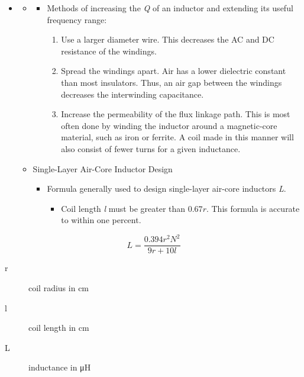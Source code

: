\begin{itemize}
	\item[] 
	\begin{itemize}
		\item[]
		\begin{itemize}
			\item Methods of increasing the \textit{Q} of an inductor and extending its useful frequency range:
			\begin{enumerate}
				\item Use a larger diameter wire. This decreases the AC and
				DC resistance of the windings.
				\item Spread the windings apart. Air has a lower dielectric
				constant than most insulators. Thus, an air gap between
				the windings decreases the interwinding capacitance.
				\item Increase the permeability of the flux linkage path. This
				is most often done by winding the inductor around a
				magnetic-core material, such as iron or ferrite. A coil
				made in this manner will also consist of fewer turns for a
				given inductance.
			\end{enumerate}
		\end{itemize}
		\item Single-Layer Air-Core Inductor Design
		\begin{itemize}
			\item Formula generally used to design single-layer air-core
			inductors \textit{L}.
			\begin{itemize}
				\item Coil length \textit{l} must be greater than $0.67r$. This formula is accurate to within one percent.
			\end{itemize}
		\end{itemize}
	\end{itemize}
\end{itemize}

\begin{equation}
L = \dfrac{0.394 r^2 N^2}{9r + 10l}
\end{equation}

\begin{description}
	\item[r] coil radius in \si{\centi\meter}
	\item[l] coil length in \si{\centi\meter}
	\item[L] inductance in \si{\micro\henry}
\end{description}

